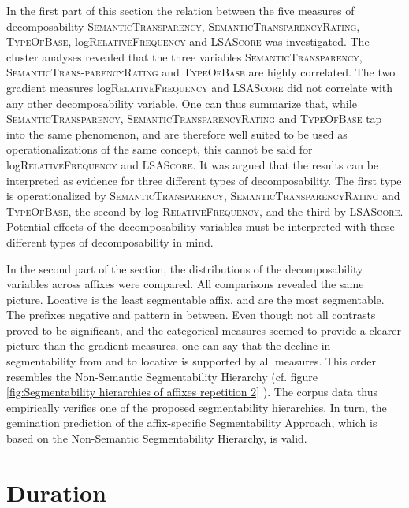 In the first part of this section the relation between the five measures of decomposability \textsc{SemanticTransparency}, \textsc{SemanticTransparencyRating}, \textsc{TypeOfBase}, log\textsc{RelativeFrequency} and \textsc{LSAScore} was investigated. The cluster analyses revealed that the three variables \textsc{SemanticTransparency}, \textsc{SemanticTrans-parencyRating} and \textsc{TypeOfBase} are highly correlated. The two gradient measures  log\textsc{RelativeFrequency} and \textsc{LSAScore}  did not correlate with any other decomposability variable.  
One can thus summarize that, while  \textsc{SemanticTransparency}, \textsc{SemanticTransparencyRating} and \textsc{TypeOfBase} tap into the same phenomenon, and are therefore well suited to be used as operationalizations of the same concept, this cannot be said for 
log\textsc{RelativeFrequency} and \textsc{LSAScore}. 
It was argued that the results can be interpreted as evidence for three different types of decomposability. The first type is operationalized by  \textsc{SemanticTransparency}, \textsc{SemanticTransparencyRating} and \textsc{TypeOfBase}, the second by log-\textsc{RelativeFrequency}, and the third by \textsc{LSAScore}. Potential effects of the decomposability variables must be interpreted with these different types of decomposability in mind. 

 In the second part of the section, the distributions of the decomposability variables across affixes were compared. All comparisons revealed the same picture. Locative  is the least segmentable affix,  and  are the most segmentable. The prefixes negative  and  pattern in between. 
 Even though not all contrasts proved to be significant, and the categorical measures seemed to provide a clearer picture than the gradient measures, one can say that the decline in segmentability from  and  to locative  is supported by all measures. 
 This order resembles the Non-Semantic Segmentability Hierarchy (cf. figure \ref{fig:Segmentability hierarchies of  affixes repetition 2} ). The corpus data thus empirically verifies one of the proposed segmentability hierarchies. In turn, the gemination prediction of the affix-specific Segmentability Approach, which is based on the Non-Semantic Segmentability Hierarchy, is valid. 

\section{Duration}


